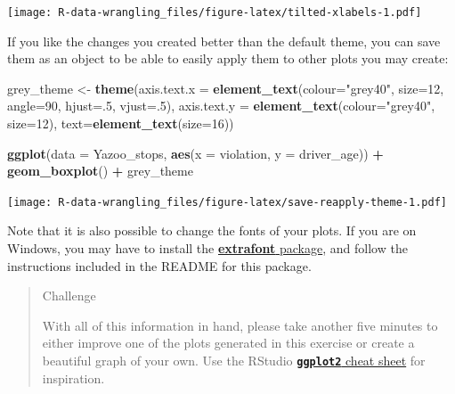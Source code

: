 \documentclass[]{book}
\newenvironment{Shaded}{\begin{snugshade}}{\end{snugshade}}
\newcommand{\DataTypeTok}[1]{\textcolor[rgb]{0.13,0.29,0.53}{#1}}
\newcommand{\DecValTok}[1]{\textcolor[rgb]{0.00,0.00,0.81}{#1}}
\newcommand{\KeywordTok}[1]{\textcolor[rgb]{0.13,0.29,0.53}{\textbf{#1}}}
\newcommand{\NormalTok}[1]{#1}
\newcommand{\OperatorTok}[1]{\textcolor[rgb]{0.81,0.36,0.00}{\textbf{#1}}}
\newcommand{\StringTok}[1]{\textcolor[rgb]{0.31,0.60,0.02}{#1}}
\begin{document}
\texttt{[image: R-data-wrangling\_files/figure-latex/tilted-xlabels-1.pdf]}

If you like the changes you created better than the default theme, you can save them as an object to be able to easily apply them to other plots you may create:

\begin{Shaded}
\begin{Highlighting}[]
\NormalTok{grey_theme <-}\StringTok{ }\KeywordTok{theme}\NormalTok{(}\DataTypeTok{axis.text.x =} \KeywordTok{element_text}\NormalTok{(}\DataTypeTok{colour=}\StringTok{"grey40"}\NormalTok{, }
                                               \DataTypeTok{size=}\DecValTok{12}\NormalTok{, }\DataTypeTok{angle=}\DecValTok{90}\NormalTok{, }
                                               \DataTypeTok{hjust=}\NormalTok{.}\DecValTok{5}\NormalTok{, }\DataTypeTok{vjust=}\NormalTok{.}\DecValTok{5}\NormalTok{),}
                   \DataTypeTok{axis.text.y =} \KeywordTok{element_text}\NormalTok{(}\DataTypeTok{colour=}\StringTok{"grey40"}\NormalTok{, }\DataTypeTok{size=}\DecValTok{12}\NormalTok{),}
                   \DataTypeTok{text=}\KeywordTok{element_text}\NormalTok{(}\DataTypeTok{size=}\DecValTok{16}\NormalTok{))}

\KeywordTok{ggplot}\NormalTok{(}\DataTypeTok{data =}\NormalTok{ Yazoo_stops, }\KeywordTok{aes}\NormalTok{(}\DataTypeTok{x =}\NormalTok{ violation, }\DataTypeTok{y =}\NormalTok{ driver_age)) }\OperatorTok{+}
\StringTok{  }\KeywordTok{geom_boxplot}\NormalTok{() }\OperatorTok{+}\StringTok{ }
\StringTok{  }\NormalTok{grey_theme}
\end{Highlighting}
\end{Shaded}

\texttt{[image: R-data-wrangling\_files/figure-latex/save-reapply-theme-1.pdf]}

Note that it is also possible to change the fonts of your plots. If you are on Windows, you may have to install the \href{https://github.com/wch/extrafont}{\textbf{extrafont} package}, and follow the instructions included in the README for this package.

\begin{quote}
Challenge

With all of this information in hand, please take another five minutes to either
improve one of the plots generated in this exercise or create a beautiful graph
of your own. Use the RStudio \href{https://www.rstudio.com/wp-content/uploads/2016/11/ggplot2-cheatsheet-2.1.pdf}{\textbf{\texttt{ggplot2}} cheat sheet} for
inspiration.
\end{quote}
\end{document}
